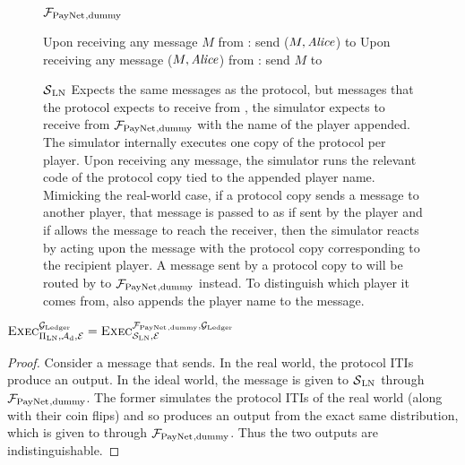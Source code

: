 \begin{figure}[!htbp]
  \begin{systembox}{$\mathcal{F}_{\mathrm{PayNet}}{}_{\mathrm{, dummy}}$}
    \begin{algorithmic}[1]
      \State Upon receiving any message $M$ from \alice: send ($M, \mathit{Alice}$) to
      \simulator
      \State Upon receiving any message ($M, \mathit{Alice}$) from \simulator: send $M$
      to \alice
    \end{algorithmic}
  \end{systembox}
  \caption{}
  \label{alg:fpaynet:dummy}
\end{figure}

\begin{figure}[!htbp]
  \begin{simulatorbox}{$\mathcal{S}{}_{\mathrm{LN}}$}
    Expects the same messages as the protocol, but messages that the protocol
    expects to receive from \environment, the simulator expects to receive from
    $\mathcal{F}_{\mathrm{PayNet}}{}_{\mathrm{, dummy}}$ with the name of the player appended. The
    simulator internally executes one copy of the protocol per player. Upon
    receiving any message, the simulator runs the relevant code of the protocol
    copy tied to the appended player name. Mimicking the real-world case, if a
    protocol copy sends a message to another player, that message is passed to
    \adversary{} as if sent by the player and if \adversary{} allows the message
    to reach the receiver, then the simulator reacts by acting upon the message
    with the protocol copy corresponding to the recipient player. A message sent
    by a protocol copy to \environment{} will be routed by \simulator{} to
    $\mathcal{F}_{\mathrm{PayNet}}{}_{\mathrm{, dummy}}$ instead. To distinguish which player it
    comes from, \simulator{} also appends the player name to the message.
  \end{simulatorbox}
  \caption{}
  \label{alg:sim:ln}
\end{figure}

\begin{lemma}
  \label{lemma:dummy}
  $\textsc{Exec}^{\mathcal{G}_{\mathrm{Ledger}}}_{\Pi_{\mathrm{LN}}, \mathcal{A}_{\mathrm{d}},
  \mathcal{E}} = \textsc{Exec}^{\mathcal{F}_{\mathrm{PayNet}}{}_{\mathrm{, dummy}},
  \mathcal{G}_{\mathrm{Ledger}}}_{\mathcal{S}_{\mathrm{LN}}, \mathcal{E}}$
\end{lemma}

\begin{proof}
  Consider a message that \environment{} sends. In the real world, the protocol
  ITIs produce an output. In the ideal world, the message is given to
  $\mathcal{S}{}_{\mathrm{LN}}$ through $\mathcal{F}_{\mathrm{PayNet}}{}_{\mathrm{, dummy}}$. The
  former simulates the protocol ITIs of the real world (along with their coin
  flips) and so produces an output from the exact same distribution, which is
  given to \environment{} through $\mathcal{F}_{\mathrm{PayNet}}{}_{\mathrm{, dummy}}$. Thus the two
  outputs are indistinguishable.
\end{proof}

